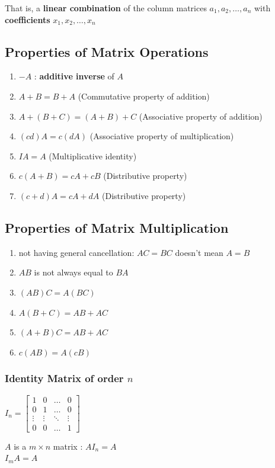 \documentclass{article}
\newcommand\B{\textbf}
\newcommand\x{\times}
\begin{document}
    That is, a \textbf{linear combination} of the column matrices \B{$a_1, a_2, \dots, a_n$} 
    with \B{coefficients} $x_1, x_2, \dots, x_n$

    \subsection*{Properties of Matrix Operations}
    \begin{enumerate}
        \item $-A$ : \B{additive inverse} of $A$
        \item $A + B = B + A$ (Commutative property of addition)
        \item $A + (B + C) = (A + B) + C$ (Associative property of addition)
        \item $(cd)A = c(dA)$ (Associative property of multiplication)
        \item $IA = A$ (Multiplicative identity)
        \item $c(A + B) = cA + cB$ (Distributive property)
        \item $(c+ d)A = cA + dA$ (Distributive property)
    \end{enumerate}

    \subsection*{Properties of Matrix Multiplication}
    \begin{enumerate}
        \item not having general cancellation:  $AC = BC$ doesn't mean $A = B$
        \item $AB$ is not always equal to $BA$
        \item $(AB)C = A(BC)$ 
        \item $A(B + C) = AB + AC$
        \item $(A + B)C = AB + AC$
        \item $c(AB) = A(cB)$
    \end{enumerate}

    \subsubsection*{Identity Matrix of order $n$}
    $ I_n = \begin{bmatrix}
        1 & 0 & \dots & 0 \\
        0 & 1 & \dots & 0 \\
        \vdots & \vdots & \ddots & \vdots \\
        0 & 0 & \dots & 1
    \end{bmatrix}$
    \begin{tcolorbox}
        $A$ is a $m \x n$ matrix :
        $AI_n = A$ \\
        $I_mA = A$
    \end{tcolorbox}
    
\end{document}

